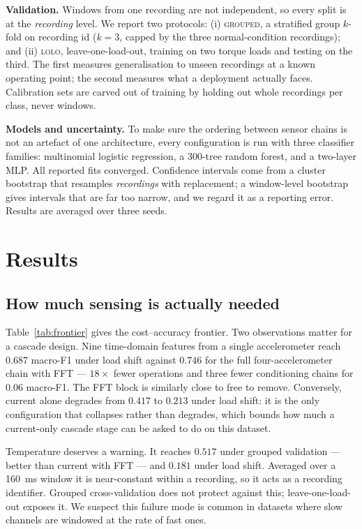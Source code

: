 \documentclass{article}
\begin{document}
\textbf{Validation.} Windows from one recording are not independent, so
every split is at the \emph{recording} level. We report two protocols:
(i) \textsc{grouped}, a stratified group $k$-fold on recording id
($k=3$, capped by the three normal-condition recordings); and
(ii) \textsc{lolo}, leave-one-load-out, training on two torque loads and
testing on the third. The first measures generalisation to unseen
recordings at a known operating point; the second measures what a
deployment actually faces. Calibration sets are carved out of training by
holding out whole recordings per class, never windows.

\textbf{Models and uncertainty.} To make sure the ordering between sensor
chains is not an artefact of one architecture, every configuration is run
with three classifier families: multinomial logistic regression, a
300-tree random forest, and a two-layer MLP. All reported fits converged.
Confidence intervals come from a cluster bootstrap that resamples
\emph{recordings} with replacement; a window-level bootstrap gives
intervals that are far too narrow, and we regard it as a reporting error.
Results are averaged over three seeds.

\section{Results}



\subsection{How much sensing is actually needed}
Table~\ref{tab:frontier} gives the cost--accuracy frontier. Two
observations matter for a cascade design. Nine time-domain features from a
single accelerometer reach $0.687$ macro-F1 under load shift against
$0.746$ for the full four-accelerometer chain with FFT --- $18\times$
fewer operations and three fewer conditioning chains for $0.06$ macro-F1.
The FFT block is similarly close to free to remove. Conversely, current
alone degrades from $0.417$ to $0.213$ under load shift: it is the only
configuration that collapses rather than degrades, which bounds how much a
current-only cascade stage can be asked to do on this dataset.

Temperature deserves a warning. It reaches $0.517$ under grouped
validation --- better than current with FFT --- and $0.181$ under load
shift. Averaged over a \SI{160}{\milli\second} window it is near-constant
within a recording, so it acts as a recording identifier. Grouped
cross-validation does not protect against this; leave-one-load-out exposes
it. We suspect this failure mode is common in datasets where slow channels
are windowed at the rate of fast ones.
\end{document}
